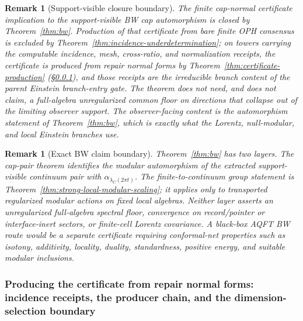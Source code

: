 \documentclass[11pt]{article}
\newtheorem{remark}[theorem]{Remark}
\begin{document}
\begin{remark}[Support-visible closure boundary]
The finite cap-normal certificate implication to the support-visible BW cap automorphism is closed
by Theorem~\ref{thm:bw}. Production of that certificate from bare finite OPH consensus is excluded
by Theorem~\ref{thm:incidence-underdetermination}; on towers carrying the computable incidence,
mesh, cross-ratio, and normalization receipts, the certificate is produced from repair normal forms
by Theorem~\ref{thm:certificate-production}
(\S\ref{subsec:quotient-intrinsic-geometry-producer}), and those receipts are the irreducible
branch content of the parent Einstein branch-entry gate. The theorem does not need, and does not claim, a full-algebra
unregularized common floor on directions that collapse out of the limiting observer support. The
observer-facing content is the automorphism statement of Theorem~\ref{thm:bw}, which is exactly
what the Lorentz, null-modular, and local Einstein branches use.
\end{remark}

\begin{remark}[Exact BW claim boundary]\label{rem:bw-stronger-not-claimed}
Theorem~\ref{thm:bw} has two layers. The cap-pair theorem identifies the modular automorphism of
the extracted support-visible continuum pair with \(\alpha_{\lambda_C(2\pi t)}\). The
finite-to-continuum group statement is Theorem~\ref{thm:strong-local-modular-scaling}; it applies
only to transported regularized modular actions on fixed local algebras. Neither layer asserts an
unregularized full-algebra spectral floor, convergence on record/pointer or interface-inert
sectors, or finite-cell Lorentz covariance. A black-box AQFT BW route would be a separate
certificate requiring conformal-net properties such as isotony, additivity, locality, duality,
standardness, positive energy, and suitable modular inclusions.
\end{remark}

\subsubsection{Producing the certificate from repair normal forms: incidence receipts, the producer chain, and the dimension-selection boundary}
\label{subsec:quotient-intrinsic-geometry-producer}
\end{document}
